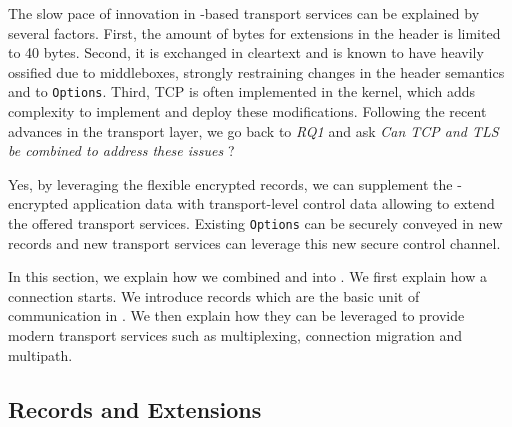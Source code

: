


The slow pace of innovation in \tcp-based transport services can be explained by 
several factors. First, the amount of bytes for extensions in the \tcp header is
limited to 40 bytes. Second, it is exchanged in cleartext and is known to have heavily
ossified due to middleboxes, strongly restraining changes in the header semantics 
and to \tcp \texttt{Options}. Third, TCP is often implemented in the kernel, 
which adds complexity to implement and deploy these modifications. Following the
recent advances in the transport layer, we go back to {\small{\textit{RQ1}}}
and ask \textit{Can TCP and TLS be combined to address these issues} ?

Yes, by leveraging the
flexible encrypted \tls records, we can supplement the \tls-encrypted application data
with transport-level control data allowing to extend the offered transport services.
Existing \tcp \texttt{Options} can be securely conveyed in new \tls records and 
new transport services can leverage this new secure control channel.

In this section, we explain how we combined \tcp and \tls into \tcpls. We first explain how
a \tcpls connection starts. We introduce
\tcpls records which are the basic unit of communication in \tcpls. We then explain
how they can be leveraged to provide modern transport services such as multiplexing,
connection migration and multipath.


\subsection{\tls Records and Extensions}

